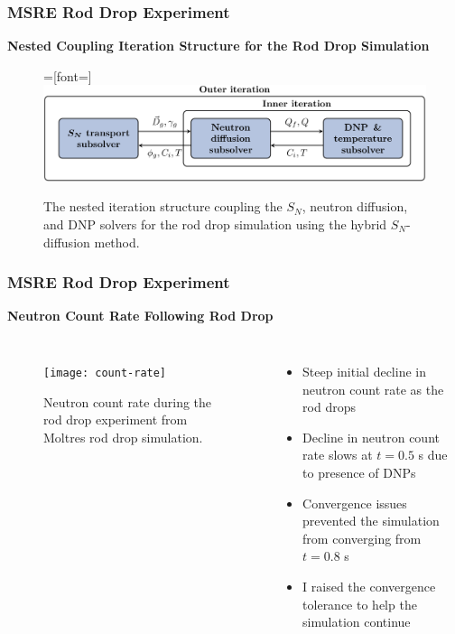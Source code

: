 \begin{frame}
  \frametitle{MSRE Rod Drop Experiment}
  \textbf{Nested Coupling Iteration Structure for the Rod Drop Simulation}
  \begin{figure}[t]
    =[font=\small]
    \centering
    \includegraphics[width=\columnwidth]{images/nest-1}
    \caption{The nested iteration structure coupling the $S_N$, neutron diffusion, and \gls{DNP}
    solvers for the rod drop simulation using the hybrid $S_N$-diffusion method.}
    \label{fig:rod-drop-coupling}
  \end{figure}
\end{frame}

\begin{frame}
  \frametitle{MSRE Rod Drop Experiment}
  \textbf{Neutron Count Rate Following Rod Drop}
  \begin{columns}
    \column{5.5cm}
    \begin{figure}[t]
      \centering
      \texttt{[image: count-rate]}
      \caption{Neutron count rate during the rod drop experiment from Moltres rod drop simulation.}
      \label{fig:count-rate}
    \end{figure}
    \column{5.5cm}
    \begin{itemize}
      \item Steep initial decline in neutron count rate as the rod drops
      \item Decline in neutron count rate slows at $t=0.5$ s due to presence of DNPs
      \item Convergence issues prevented the simulation from converging from $t = 0.8$ s
      \item I raised the convergence tolerance to help the simulation continue
    \end{itemize}
  \end{columns}
\end{frame}

